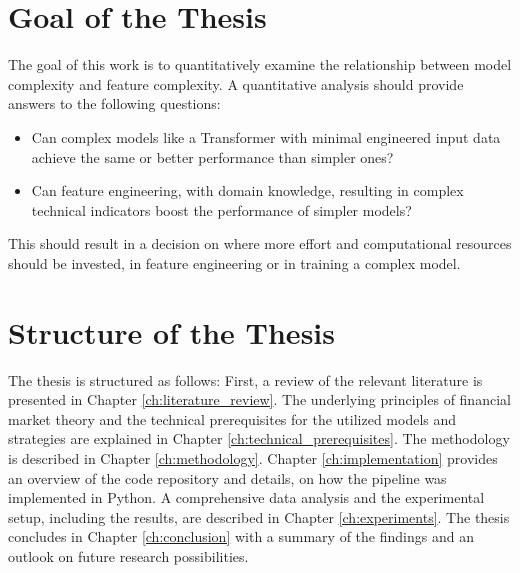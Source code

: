 \documentclass[12pt,twoside=false,a4paper,parskip]{scrbook}
\begin{document}

\section{Goal of the Thesis}
The goal of this work is to quantitatively examine the relationship between model complexity and feature complexity. A quantitative analysis should provide answers to the following questions:
\begin{itemize}
\item Can complex models like a Transformer with minimal engineered input data achieve the same or better performance than simpler ones?
\item Can feature engineering, with domain knowledge, resulting in complex technical indicators boost the performance of simpler models?
\end{itemize}
This should result in a decision on where more effort and computational resources should be invested, in feature engineering or in training a complex model.

\section{Structure of the Thesis}

The thesis is structured as follows: First, a review of the relevant literature is presented in Chapter \ref{ch:literature_review}. 
The underlying principles of financial market theory and the technical prerequisites for the utilized models and strategies are explained in Chapter \ref{ch:technical_prerequisites}. 
The methodology is described in Chapter \ref{ch:methodology}. Chapter \ref{ch:implementation} provides an overview of the code repository and details, on how the pipeline was implemented in Python. 
A comprehensive data analysis and the experimental setup, including the results, are described in Chapter \ref{ch:experiments}. 
The thesis concludes in Chapter \ref{ch:conclusion} with a summary of the findings and an outlook on future research possibilities.
\end{document}
